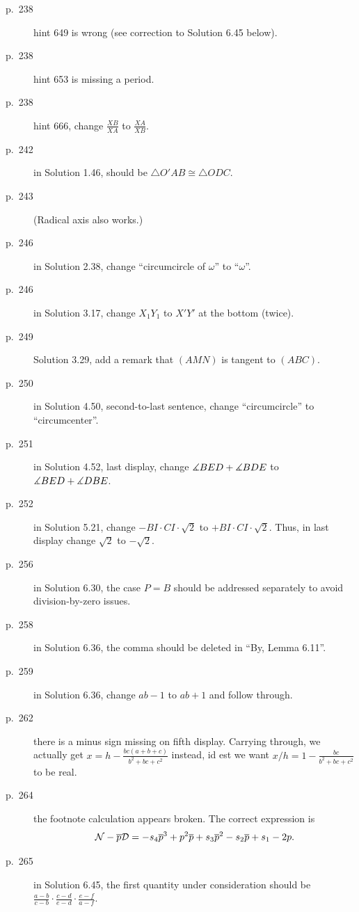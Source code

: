 \documentclass[11pt]{scrartcl}
\begin{document}
\begin{description}
\item[p.\  238] hint 649 is wrong (see correction to Solution 6.45 below).
\item[p.\  238] hint 653 is missing a period.
\item[p.\  238] hint 666, change $\frac{XB}{XA}$ to $\frac{XA}{XB}$.
\item[p.\  242] in Solution 1.46, should be $\triangle O'AB \cong \triangle ODC$.
\item[p.\  243] 
  (Radical axis also works.)
\item[p.\  246] in Solution 2.38, change ``circumcircle of $\omega$'' to ``$\omega$''.
\item[p.\  246] in Solution 3.17, change $X_1Y_1$ to $X'Y'$ at the bottom (twice).
\item[p.\  249] Solution 3.29, add a remark that $(AMN)$ is tangent to $(ABC)$.
\item[p.\  250] in Solution 4.50, second-to-last sentence,
  change ``circumcircle'' to ``circumcenter''.
\item[p.\  251] in Solution 4.52, last display,
  change $\measuredangle BED + \measuredangle BDE$ to $\measuredangle BED + \measuredangle DBE$.
\item[p.\  252] in Solution 5.21, change $-BI \cdot CI \cdot \sqrt2$ to $+ BI \cdot CI \cdot \sqrt2$.
  Thus, in last display change $\sqrt2$ to $-\sqrt2$.
\item[p.\  256] in Solution 6.30, the case $P=B$ should be addressed separately
  to avoid division-by-zero issues.
\item[p.\  258] in Solution 6.36, the comma should be deleted in ``By, Lemma 6.11''.
\item[p.\  259] in Solution 6.36, change $ab-1$ to $ab+1$ and follow through.
\item[p.\  262] there is a minus sign missing on fifth display.
  Carrying through, we actually get $x = h - \frac{bc(a+b+c)}{b^2+bc+c^2}$ instead,
  id est we want $x/h = 1 - \frac{bc}{b^2+bc+c^2}$ to be real.
\item[p.\  264] the footnote calculation appears broken. The correct expression is
  \[ \mathcal{N} - \overline p \mathcal{D}
    = -s_4 \overline p^3 + p^2 \overline p + s_3 \overline p^2 - s_2 \overline p + s_1 - 2 p.  \]
\item[p.\  265] in Solution 6.45, the first quantity under consideration should be
  $\frac{a-b}{c-b}\cdot\frac{c-d}{e-d}\cdot\frac{e-f}{a-f}$.

\end{description}
\end{document}

